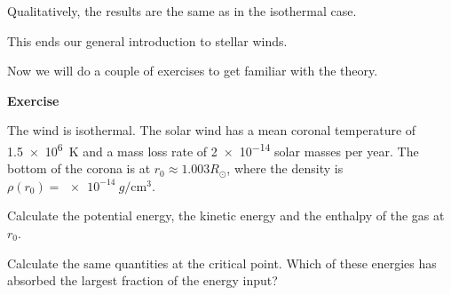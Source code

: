 \documentclass[main.tex]{subfiles}
\begin{document}
Qualitatively, the results are the same as in the isothermal case.

This ends our general introduction to stellar winds.

Now we will do a couple of exercises to get familiar with the theory. 

\begin{greenbox} \textbf{Exercise}

The wind is isothermal.
The solar wind has a mean coronal temperature of \SI{1.5e6}{K} and a mass loss rate of \num{2e-14} solar masses per year.
The bottom of the corona is at \(r_0 \approx 1.003 R_{\odot}\), where the density is \(\rho (r_0 ) = \SI{e-14}{g\per\centi\metre\cubed}\).

Calculate the potential energy, the kinetic energy and the enthalpy of the gas at \(r_0 \).

Calculate the same quantities at the critical point. Which of these energies has absorbed the largest fraction of the energy input?
\end{greenbox}
\end{document}
